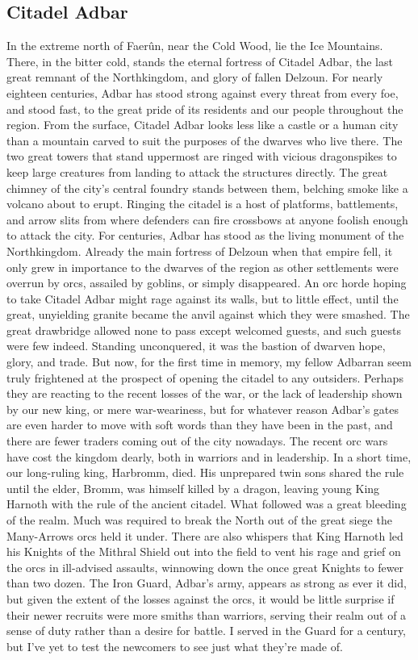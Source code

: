 \documentclass[10pt,a4paper,twoside,twocolumn,openany,bg=print,nodeprecatedcode]{dndbook}
\begin{document}
\subsection{Citadel Adbar}
In the extreme north of Faerûn, near the Cold Wood, lie the Ice Mountains. There, in the bitter cold, stands the eternal fortress of Citadel Adbar, the last great remnant of the Northkingdom, and glory of fallen Delzoun. For nearly eighteen centuries, Adbar has stood strong against every threat from every foe, and stood fast, to the great pride of its residents and our people throughout the region.
From the surface, Citadel Adbar looks less like a castle or a human city than a mountain carved to suit the purposes of the dwarves who live there. The two great towers that stand uppermost are ringed with vicious dragonspikes to keep large creatures from landing to attack the structures directly. The great chimney of the city's central foundry stands between them, belching smoke like a volcano about to erupt. Ringing the citadel is a host of platforms, battlements, and arrow slits from where defenders can fire crossbows at anyone foolish enough to attack the city.
For centuries, Adbar has stood as the living monument of the Northkingdom. Already the main fortress of Delzoun when that empire fell, it only grew in importance to the dwarves of the region as other settlements were overrun by orcs, assailed by goblins, or simply disappeared. An orc horde hoping to take Citadel Adbar might rage against its walls, but to little effect, until the great, unyielding granite became the anvil against which they were smashed. The great drawbridge allowed none to pass except welcomed guests, and such guests were few indeed. Standing unconquered, it was the bastion of dwarven hope, glory, and trade.
But now, for the first time in memory, my fellow Adbarran seem truly frightened at the prospect of opening the citadel to any outsiders. Perhaps they are reacting to the recent losses of the war, or the lack of leadership shown by our new king, or mere war-weariness, but for whatever reason Adbar's gates are even harder to move with soft words than they have been in the past, and there are fewer traders coming out of the city nowadays.
The recent orc wars have cost the kingdom dearly, both in warriors and in leadership. In a short time, our long-ruling king, Harbromm, died. His unprepared twin sons shared the rule until the elder, Bromm, was himself killed by a dragon, leaving young King Harnoth with the rule of the ancient citadel.
What followed was a great bleeding of the realm. Much was required to break the North out of the great siege the Many-Arrows orcs held it under. There are also whispers that King Harnoth led his Knights of the Mithral Shield out into the field to vent his rage and grief on the orcs in ill-advised assaults, winnowing down the once great Knights to fewer than two dozen. The Iron Guard, Adbar's army, appears as strong as ever it did, but given the extent of the losses against the orcs, it would be little surprise if their newer recruits were more smiths than warriors, serving their realm out of a sense of duty rather than a desire for battle. I served in the Guard for a century, but I've yet to test the newcomers to see just what they're made of.
\end{document}
